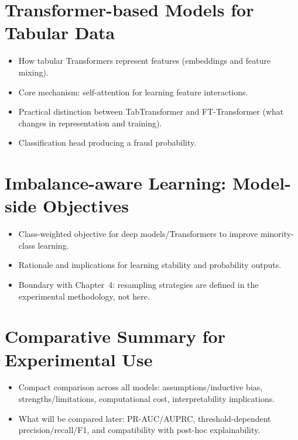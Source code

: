 \section{Transformer-based Models for Tabular Data}
\label{sec:models_tabular_transformers}
\begin{itemize}
  \item How tabular Transformers represent features (embeddings and feature mixing).
  \item Core mechanism: self-attention for learning feature interactions.
  \item Practical distinction between TabTransformer and FT-Transformer (what changes in representation and training).
  \item Classification head producing a fraud probability.
\end{itemize}

\section{Imbalance-aware Learning: Model-side Objectives}
\label{sec:models_imbalance_objectives}
\begin{itemize}
  \item Class-weighted objective for deep models/Transformers to improve minority-class learning.
  \item Rationale and implications for learning stability and probability outputs.
  \item Boundary with Chapter~4: resampling strategies are defined in the experimental methodology, not here.
\end{itemize}

\section{Comparative Summary for Experimental Use}
\label{sec:models_comparative_summary}
\begin{itemize}
  \item Compact comparison across all models: assumptions/inductive bias, strengths/limitations, computational cost, interpretability implications.
  \item What will be compared later: PR-AUC/AUPRC, threshold-dependent precision/recall/F1, and compatibility with post-hoc explainability.
\end{itemize}
